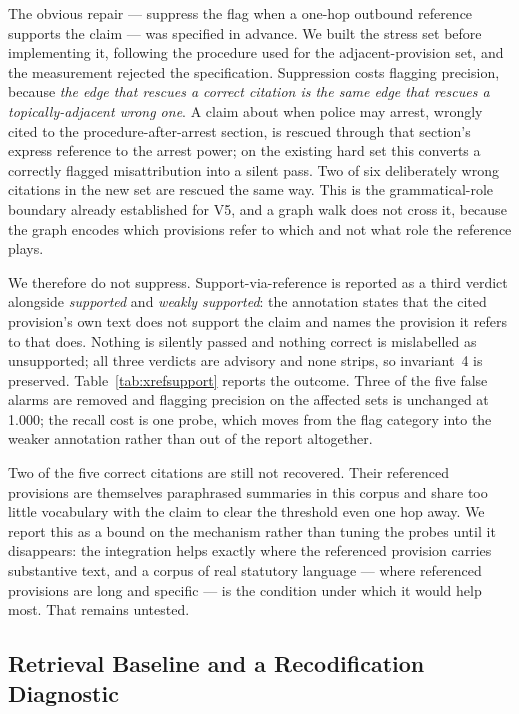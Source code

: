 \documentclass[conference]{IEEEtran}
\begin{document}
The obvious repair --- suppress the flag when a one-hop outbound reference
supports the claim --- was specified in advance. We built the stress set before
implementing it, following the procedure used for the adjacent-provision set,
and the measurement rejected the specification. Suppression costs flagging
precision, because \emph{the edge that rescues a correct citation is the same
edge that rescues a topically-adjacent wrong one}. A claim about when police
may arrest, wrongly cited to the procedure-after-arrest section, is rescued
through that section's express reference to the arrest power; on the existing
hard set this converts a correctly flagged misattribution into a silent pass.
Two of six deliberately wrong citations in the new set are rescued the same
way. This is the grammatical-role boundary already established for V5, and a
graph walk does not cross it, because the graph encodes which provisions refer
to which and not what role the reference plays.

We therefore do not suppress. Support-via-reference is reported as a third
verdict alongside \emph{supported} and \emph{weakly supported}: the annotation
states that the cited provision's own text does not support the claim and names
the provision it refers to that does. Nothing is silently passed and nothing
correct is mislabelled as unsupported; all three verdicts are advisory and none
strips, so invariant~4 is preserved. Table~\ref{tab:xrefsupport} reports the
outcome. Three of the five false alarms are removed and flagging precision on
the affected sets is unchanged at 1.000; the recall cost is one probe, which
moves from the flag category into the weaker annotation rather than out of the
report altogether.

Two of the five correct citations are still not recovered. Their referenced
provisions are themselves paraphrased summaries in this corpus and share too
little vocabulary with the claim to clear the threshold even one hop away. We
report this as a bound on the mechanism rather than tuning the probes until it
disappears: the integration helps exactly where the referenced provision
carries substantive text, and a corpus of real statutory language --- where
referenced provisions are long and specific --- is the condition under which it
would help most. That remains untested.

\subsection{Retrieval Baseline and a Recodification Diagnostic}
\end{document}
